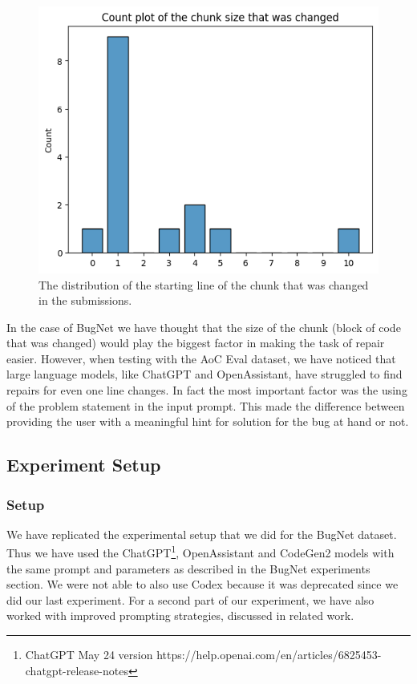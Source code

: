 \documentclass[12pt,a4paper]{report}
\begin{document}
\begin{figure}[hp!]
\centering
\includegraphics[width=\textwidth]{pics/aoc_submissionchunksize.png}
  \caption{The distribution of the starting line of the chunk that was changed in the submissions.}
  \label{fig:aoceda3}
\end{figure}

In the case of BugNet we have thought that the size of the chunk (block of code that was changed) would play the biggest factor in making the task of repair easier. However, when testing with the AoC Eval dataset, we have noticed that large language models, like ChatGPT and OpenAssistant, have struggled to find repairs for even one line changes. In fact the most important factor was the using of the problem statement in the input prompt. This made the difference between providing the user with a meaningful hint for solution for the bug at hand or not.

\subsection{Experiment Setup}

\subsubsection{Setup}

We have replicated the experimental setup that we did for the BugNet dataset. Thus we have used the ChatGPT\footnote{ChatGPT May 24 version https://help.openai.com/en/articles/6825453-chatgpt-release-notes}, OpenAssistant and CodeGen2 models with the same prompt and parameters as described in the BugNet experiments section. We were not able to also use Codex because it was deprecated since we did our last experiment. For a second part of our experiment, we have also worked with improved prompting strategies, discussed in related work.
\end{document}
